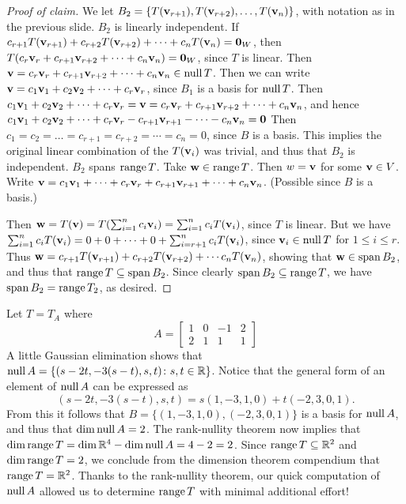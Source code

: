 \begin{frame}
 \begin{proof}[Proof of claim]
 We let $B_2=\{T({\mathbf v}_{r+1}), T({\mathbf v}_{r+2}), \dots, T({\mathbf v}_{n})\}$, with notation as in the previous slide. 
\bspace
\alert{$B_2$ is linearly independent}. 
\bspace If
$ c_{r+1}T({\mathbf v}_{r+1})+c_{r+2}T({\mathbf v}_{r+2})+ \dots+c_{n}T({\mathbf v}_{n})={\mathbf 0}_W$, then $T(c_r{\mathbf v}_{r}+c_{r+1}{\mathbf v}_{r+2}+ \dots+c_{n}{\mathbf v}_{n})={\mathbf 0}_W$, since $T$ is linear. 
\bpause Then ${\mathbf v}=c_r{\mathbf v}_{r}+c_{r+1}{\mathbf v}_{r+2}+ \dots+c_{n}{\mathbf v}_{n}\in\operatorname{null} T$. 
\bpause Then we can write ${\mathbf v}=c_1{\mathbf v}_1+c_2{\mathbf v}_2+\cdots +c_r{\mathbf v}_r$, since $B_1$ is a basis for $\operatorname{null} T$. 
\bpause 
Then $c_1{\mathbf v}_1+c_2{\mathbf v}_2+\cdots +c_r{\mathbf v}_r={\mathbf v}=c_r{\mathbf v}_{r}+c_{r+1}{\mathbf v}_{r+2}+ \dots+c_{n}{\mathbf v}_{n}$, and hence $c_1{\mathbf v}_1+c_2{\mathbf v}_2+\cdots +c_r{\mathbf v}_r-c_{r+1}{\mathbf v}_{r+1}- \dots-c_{n}{\mathbf v}_{n}={\mathbf 0}$
\bpause 
Then $c_1=c_2=\dots=c_{r+1}=c_{r+2}=\cdots =c_n=0$, since $B$ is a basis. This implies the original linear combination of the $T({\mathbf v}_i)$ was trivial, and thus that $B_2$ is independent. 
 \bpause \alert{$B_2$ spans $\operatorname{range} T$.}
 Take ${\mathbf w}\in \operatorname{range} T$. Then $w={\mathbf v}$ for some ${\mathbf v}\in V$.
 \bpause
 Write ${\mathbf v}=c_1{\mathbf v}_1+\cdots +c_r{\mathbf v}_r+c_{r+1}{\mathbf v}_{r+1}+\cdots +c_n{\mathbf v}_n$. (Possible since $B$ is a basis.) 
 
 \pause 
 Then 
 ${\mathbf w}=T({\mathbf v})=T(\sum_{i=1}^nc_i{\mathbf v}_i)=\sum_{i=1}^nc_iT({\mathbf v}_i)$, since $T$ is linear.
 \bpause 
 But we have $\sum_{i=1}^nc_iT({\mathbf v}_i)=0+0+\cdots +0+\sum_{i=r+1}^nc_iT({\mathbf v}_i)$, since ${\mathbf v}_i\in\operatorname{null} T$ for $1\leq i\leq r$. 
 \bpause 
 Thus ${\mathbf w}=c_{r+1}T({\mathbf v}_{r+1})+c_{r+2}T({\mathbf v}_{r+2})+\cdots c_nT({\mathbf v}_n)$, showing that ${\mathbf w}\in \operatorname{span} B_2$, and thus that $\operatorname{range} T\subseteq\operatorname{span} B_2$. Since clearly $\operatorname{span} B_2\subseteq\operatorname{range} T$, we have $\operatorname{span} B_2=\operatorname{range} T_2$, as desired. 
 \end{proof}
\end{frame}
\begin{frame}
 \begin{example}
 Let $T=T_A$ where 
 \[
 A=\begin{bmatrix}
 1&0&-1&2\\
 2&1&1&1
 \end{bmatrix}
 \]
 A little Gaussian elimination shows that $\operatorname{null} A=\{(s-2t,-3(s-t),s,t)\colon s, t\in{\mathbb R}\}$. 
 \bpause
 Notice that the general form of an element of $\operatorname{null} A$ can be expressed as 
 \[
 (s-2t,-3(s-t),s,t)=s(1,-3,1,0)+t(-2,3,0,1).
 \]
 From this it follows that $B=\{ (1,-3,1,0), (-2,3,0,1)\}$ is a basis for $\operatorname{null} A$, and thus that $\dim\operatorname{null} A=2$.
 \bpause
 The rank-nullity theorem now implies that $\dim \operatorname{range} T=\dim {\mathbb R}^4-\dim\operatorname{null} A=4-2=2$. Since $\operatorname{range} T\subseteq{\mathbb R}^2$ and $\dim\operatorname{range} T=2$, we conclude from the dimension theorem compendium that $\operatorname{range} T={\mathbb R}^2$. 
 \bpause
 Thanks to the rank-nullity theorem, our quick computation of $\operatorname{null} A$ allowed us to determine $\operatorname{range} T$ with minimal additional effort! 
 \end{example}
\end{frame}
